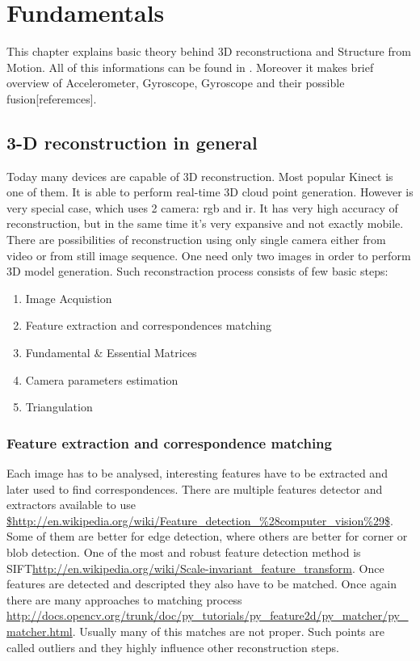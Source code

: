 
\chapter{Fundamentals} %
This chapter explains basic theory behind 3D reconstructiona and Structure from Motion. All of this informations can be found in \cite{HartleyMultipleView}. Moreover it makes brief overview of Accelerometer, Gyroscope, Gyroscope and their possible fusion[referemces]. 

\section{3-D reconstruction in general}
Today many devices are capable of 3D reconstruction. Most popular Kinect\cite{kinect} is one of them. It is able to perform real-time 3D cloud point generation. However is very special case, which uses 2 camera: \gls{rgb} and \gls{ir}. It has very high accuracy of reconstruction, but in the same time it's very expansive and not exactly mobile.
There are possibilities of reconstruction using only single camera either from video or from still image sequence. One need only two images in order to perform 3D model generation. Such reconstraction process consists of few basic steps:
\begin{enumerate}
\item Image Acquistion
\item Feature extraction and correspondences matching
\item Fundamental \& Essential Matrices
\item Camera parameters estimation
\item Triangulation
\end{enumerate}
\subsection{Feature extraction and correspondence matching}
 Each image has to be analysed, interesting features have to be extracted and later used to find correspondences. There are multiple features detector and extractors available to use \url{$http://en.wikipedia.org/wiki/Feature_detection_%28computer_vision%29$}. Some of them are better for edge detection, where others are better for corner or blob detection. One of the most and robust feature detection method is SIFT\url{http://en.wikipedia.org/wiki/Scale-invariant_feature_transform}.
\newline 
Once features are detected and descripted they also have to be matched. Once again there are many approaches to matching process \url{http://docs.opencv.org/trunk/doc/py_tutorials/py_feature2d/py_matcher/py_matcher.html}. Usually many of this matches are not proper. Such points are called outliers and they highly influence other reconstruction steps.
